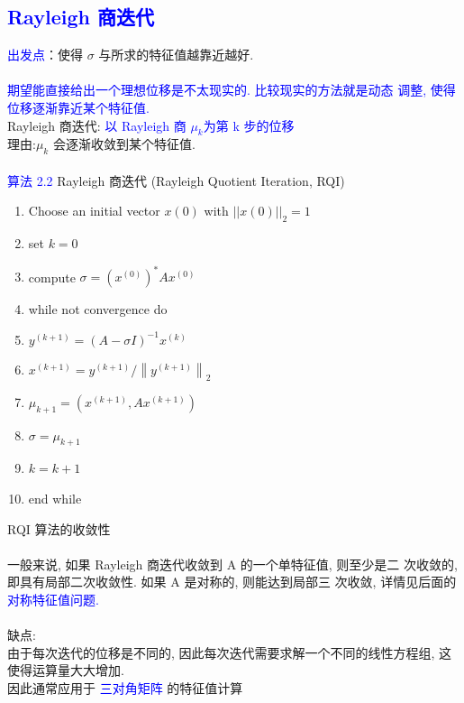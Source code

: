 \documentclass[12pt,a4paper]{article}
\begin{document}
\subsection{\textcolor{blue}{Rayleigh 商迭代}}
\noindent \textcolor{blue}{出发点}：使得 $\sigma$ 与所求的特征值越靠近越好.\\
\\
\textcolor{blue}{期望能直接给出一个理想位移是不太现实的. 比较现实的方法就是动态 调整, 使得位移逐渐靠近某个特征值.}\\
Rayleigh 商迭代: \textcolor{blue}{以 Rayleigh 商 $\mu_{k}$为第 k 步的位移}\\
 理由:$\mu_{k}$ 会逐渐收敛到某个特征值.\\
 \\
\textcolor{blue}{算法 2.2} Rayleigh 商迭代 (Rayleigh Quotient Iteration, RQI)\\
\begin{enumerate}
\item Choose an initial vector $x(0)$ with $||x(0)||_{2} = 1$
\item set $k=0$
\item compute $\sigma=\left(x^{(0)}\right)^{*} A x^{(0)}$
\item while not convergence do
\item \qquad$y^{(k+1)} = (A-\sigma I)^{-1}x^{(k)}$
\item \qquad$x^{(k+1)}=y^{(k+1)} /\left\|y^{(k+1)}\right\|_{2}$
\item \qquad$\mu_{k+1}=\left(x^{(k+1)}, A x^{(k+1)}\right)$
\item \qquad$\sigma=\mu_{k+1}$
\item \qquad$k=k+1$
\item end while
\end{enumerate}
 RQI 算法的收敛性\\
 \\
 一般来说, 如果 Rayleigh 商迭代收敛到 A 的一个单特征值, 则至少是二 次收敛的, 即具有局部二次收敛性. 如果 A 是对称的, 则能达到局部三 次收敛, 详情见后面的\textcolor{blue}{对称特征值问题.}\\
 \\
 缺点:\\
由于每次迭代的位移是不同的, 因此每次迭代需要求解一个不同的线性方程组, 这使得运算量大大增加. \\
因此通常应用于 \textcolor{blue}{三对角矩阵} 的特征值计算
\end{document}
